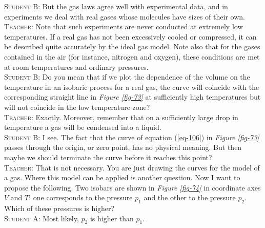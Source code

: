 \documentclass[a4paper,sfsidenotes]{tufte-book}
\begin{document}
\textsc{Student B:} But the gas laws agree well with experimental data, and in experiments we deal with real gases whose molecules have sizes of their own.
\\
\textsc{Teacher:} Note that such experiments are never conducted at extremely low temperatures. If a real gas has not been excessively cooled or compressed, it can be described quite accurately by the ideal gas model. Note also that for the gases contained in the air (for instance, nitrogen and oxygen), these conditions are met at room temperatures and ordinary pressures.
\\
\textsc{Student B:} Do you mean that if we plot the dependence of the volume on the temperature in an isobaric process for a real gas, the curve will coincide with the corresponding straight line in \emph{Figure \ref{fig-73}} at sufficiently high temperatures but will not coincide in the low temperature zone?
\\
\textsc{Teacher:} Exactly. Moreover, remember that on a sufficiently large drop in temperature a gas will be condensed into a liquid.
\\
\textsc{Student B:} I see. The fact that the curve of equation (\ref{eq-106}) in \emph{Figure \ref{fig-73}}  passes through the origin, or zero point, has no physical meaning. But then maybe we should terminate the curve before it reaches this point?
\\
\textsc{Teacher:} That is not necessary. You are just drawing the curves for the model of a gas. Where this model can be applied is another question. Now I want to propose the following. Two isobars are shown in \emph{Figure \ref{fig-74}}  in coordinate axes $V$ and $T$: one corresponds to the pressure $p_{1}$ and the other to the pressure $p_{2}$. Which of these pressures is higher?
\\
\textsc{Student A:} Most likely, $p_{2}$ is higher than $p_{1}$.
\\
\end{document}
